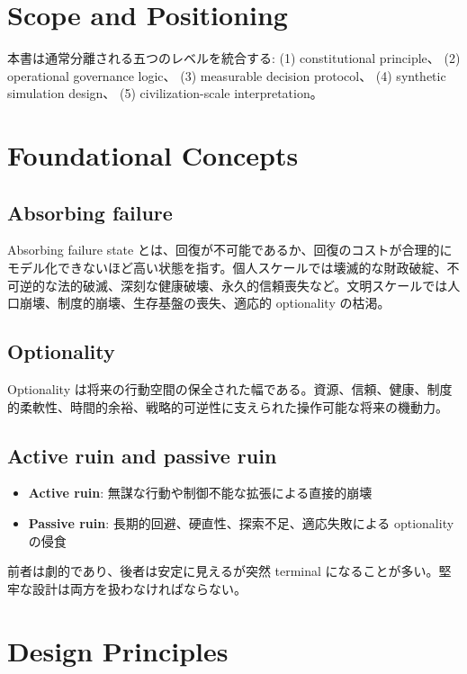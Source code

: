 \documentclass[11pt,a4paper]{article}
\theoremstyle{definition}\newtheorem{definition}{Definition}[section]
\begin{document}
\section{Scope and Positioning}

本書は通常分離される五つのレベルを統合する:
(1) constitutional principle、
(2) operational governance logic、
(3) measurable decision protocol、
(4) synthetic simulation design、
(5) civilization-scale interpretation。


\section{Foundational Concepts}

\subsection{Absorbing failure}
Absorbing failure state とは、回復が不可能であるか、回復のコストが合理的にモデル化できないほど高い状態を指す。個人スケールでは壊滅的な財政破綻、不可逆的な法的破滅、深刻な健康破壊、永久的信頼喪失など。文明スケールでは人口崩壊、制度的崩壊、生存基盤の喪失、適応的 optionality の枯渇。

\subsection{Optionality}
Optionality は将来の行動空間の保全された幅である。資源、信頼、健康、制度的柔軟性、時間的余裕、戦略的可逆性に支えられた操作可能な将来の機動力。

\subsection{Active ruin and passive ruin}
\begin{itemize}[leftmargin=1.5em]
  \item \textbf{Active ruin}: 無謀な行動や制御不能な拡張による直接的崩壊
  \item \textbf{Passive ruin}: 長期的回避、硬直性、探索不足、適応失敗による optionality の侵食
\end{itemize}
前者は劇的であり、後者は安定に見えるが突然 terminal になることが多い。堅牢な設計は両方を扱わなければならない。


\section{Design Principles}
\end{document}
